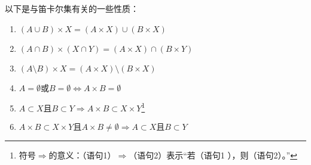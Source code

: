 \documentclass[../main.tex]{subfiles}
\begin{document}
以下是与笛卡尔集有关的一些性质：
\begin{enumerate}
\item $\left(A\cup B\right)\times X=\left(A\times X\right)\cup\left(B\times X\right)$
\item $\left(A\cap B\right)\times \left(X\cap Y\right)=\left(A\times X\right)\cap\left(B\times Y\right)$
\item $\left(A\setminus B\right)\times X=\left(A\times X\right)\setminus \left(B\times X\right)$
\item $A=\emptyset\text{或}B=\emptyset\Leftrightarrow A\times B=\emptyset$
\item $A\subset X\text{且}B\subset Y\Rightarrow A\times B\subset X\times Y$\footnote{符号$\Rightarrow$的意义：（语句1）$\Rightarrow$（语句2）表示“若（语句1 ），则（语句2）。”}
\item $A\times B\subset X\times Y\text{且}A\times B\neq\emptyset\Rightarrow A\subset X\text{且}B\subset Y$
\end{enumerate}

\end{document}
